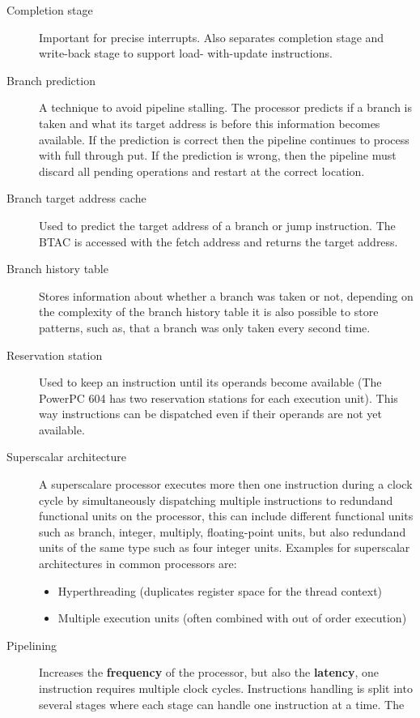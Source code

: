 \documentclass[a4paper,10pt]{article}
\begin{document}
\begin{description}
 \item[Completion stage] Important for precise interrupts. Also separates completion stage and write-back stage to support load-
       with-update instructions.
 \item[Branch prediction] A technique to avoid pipeline stalling. The processor predicts if a branch is taken and what its
       target address is before this information becomes available. If the prediction is correct then the pipeline continues to process
       with full through put. If the prediction is wrong, then the pipeline must discard all pending operations and restart at the
       correct location.
 \item[Branch target address cache] Used to predict the target address of a branch or jump instruction. The BTAC is accessed
       with the fetch address and returns the target address.
 \item[Branch history table] Stores information about whether a branch was taken or not, depending on the complexity of the
       branch history table it is also possible to store patterns, such as, that a branch was only taken every second time.
 \item[Reservation station] Used to keep an instruction until its operands become available (The PowerPC 604 has two
       reservation stations for each execution unit). This way instructions can be dispatched even if their operands are not yet
       available.
 \item[Superscalar architecture] A superscalare processor executes more then one instruction during a clock cycle by
       simultaneously dispatching multiple instructions to redundand functional units on the processor, this can include different
       functional units such as branch, integer, multiply, floating-point units, but also redundand units
       of the same type such as four integer units. Examples for superscalar architectures in common processors are:
	\begin{itemize}
	    \item Hyperthreading (duplicates register space for the thread context)
	    \item Multiple execution units (often combined with out of order execution)
	\end{itemize}
  \item[Pipelining] Increases the \textbf{frequency} of the processor, but also the \textbf{latency}, one instruction requires
multiple clock cycles. Instructions handling is split into several stages where each stage can handle one instruction at a time. The

\end{description}
\end{document}
